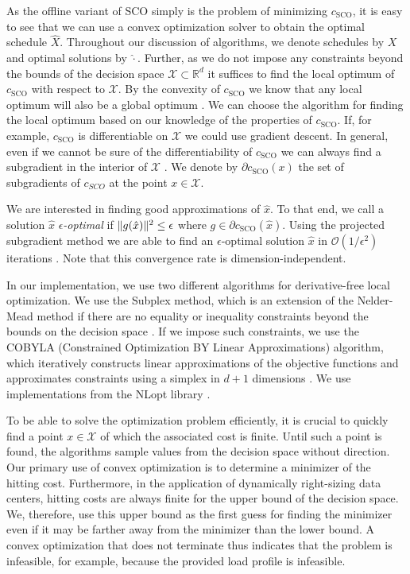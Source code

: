 As the offline variant of SCO simply is the problem of minimizing $c_{\text{SCO}}$, it is easy to see that we can use a convex optimization solver to obtain the optimal schedule $\hat{X}$. Throughout our discussion of algorithms, we denote schedules by $X$ and optimal solutions by $\hat{\cdot}$. Further, as we do not impose any constraints beyond the bounds of the decision space $\mathcal{X} \subset \mathbb{R}^d$ it suffices to find the local optimum of $c_{\text{SCO}}$ with respect to $\mathcal{X}$. By the convexity of $c_{\text{SCO}}$ we know that any local optimum will also be a global optimum \cite{Bubeck2015}. We can choose the algorithm for finding the local optimum based on our knowledge of the properties of $c_{\text{SCO}}$. If, for example, $c_{\text{SCO}}$ is differentiable on $\mathcal{X}$ we could use gradient descent. In general, even if we cannot be sure of the differentiability of $c_{\text{SCO}}$ we can always find a subgradient in the interior of $\mathcal{X}$ \cite{Bubeck2015}. We denote by $\partial c_{\text{SCO}}(x)$ the set of subgradients of $c_{SCO}$ at the point $x \in \mathcal{X}$.

We are interested in finding good approximations of $\hat{x}$. To that end, we call a solution $\hat{x}$ \emph{$\epsilon$-optimal} if $\lVert g(\hat{x})\rVert^2 \leq \epsilon$ where $g \in \partial c_{\text{SCO}}(\hat{x})$. Using the projected subgradient method we are able to find an $\epsilon$-optimal solution $\hat{x}$ in $\mathcal{O}(1 / \epsilon^2)$ iterations \cite{Boyd2003}. Note that this convergence rate is dimension-independent.

In our implementation, we use two different algorithms for derivative-free local optimization. We use the Subplex method, which is an extension of the Nelder-Mead method if there are no equality or inequality constraints beyond the bounds on the decision space \cite{Rowan1990}. If we impose such constraints, we use the COBYLA (Constrained Optimization BY Linear Approximations) algorithm, which iteratively constructs linear approximations of the objective functions and approximates constraints using a simplex in $d+1$ dimensions \cite{Powell1994, Powell1998}. We use implementations from the NLopt library \cite{Johnson}.

To be able to solve the optimization problem efficiently, it is crucial to quickly find a point $x \in \mathcal{X}$ of which the associated cost is finite. Until such a point is found, the algorithms sample values from the decision space without direction. Our primary use of convex optimization is to determine a minimizer of the hitting cost. Furthermore, in the application of dynamically right-sizing data centers, hitting costs are always finite for the upper bound of the decision space. We, therefore, use this upper bound as the first guess for finding the minimizer even if it may be farther away from the minimizer than the lower bound. A convex optimization that does not terminate thus indicates that the problem is infeasible, for example, because the provided load profile is infeasible.

